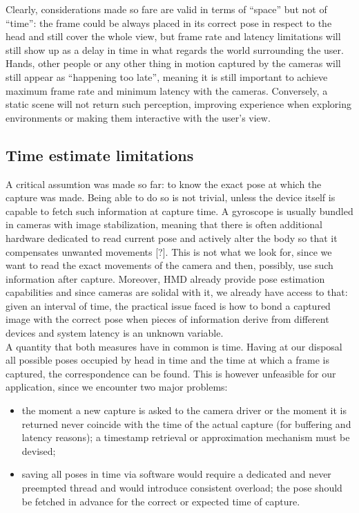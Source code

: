 Clearly, considerations made so fare are valid in terms of “space” but not of “time”: the frame could be always placed in its correct pose in respect to the head and still cover the whole view, but frame rate and latency limitations will still show up as a delay in time in what regards the world surrounding the user. Hands, other people or any other thing in motion captured by the cameras will still appear as “happening too late”, meaning it is still important to achieve maximum frame rate and minimum latency with the cameras. Conversely, a static scene will not return such perception, improving experience when exploring environments or making them interactive with the user’s view.

\subsection{Time estimate limitations}
A critical assumtion was made so far: to know the exact pose at which the capture was made. Being able to do so is not trivial, unless the device itself is capable to fetch such information at capture time. A gyroscope is usually bundled in cameras with image stabilization, meaning that there is often additional hardware dedicated to read current pose and actively alter the body so that it compensates unwanted movements [?]. This is not what we look for, since we want to read the exact movements of the camera and then, possibly, use such information after capture. Moreover, HMD already provide pose estimation capabilities and since cameras are solidal with it, we already have access to that: given an interval of time, the practical issue faced is how to bond a captured image with the correct pose when pieces of information derive from different devices and system latency is an unknown variable.\\
A quantity that both measures have in common is time. Having at our disposal all possible poses occupied by head in time and the time at which a frame is captured, the correspondence can be found. This is however unfeasible for our application, since we encounter two major problems:
\begin{itemize}
\item the moment a new capture is asked to the camera driver or the moment it is returned never coincide with the time of the actual capture (for buffering and latency reasons); a timestamp retrieval or approximation mechanism must be devised;
\item saving all poses in time via software would require a dedicated and never preempted thread and would introduce consistent overload; the pose should be fetched in advance for the correct or expected time of capture.
\end{itemize}
